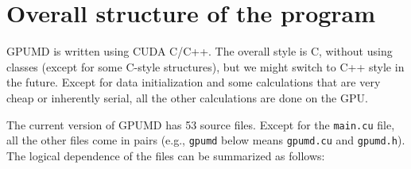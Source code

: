 \documentclass[12pt,a4paper]{report}
\begin{document}
\section{Overall structure of the program}

GPUMD is written using CUDA C/C++. The overall style is C, without using classes (except for some C-style structures), but we might switch to C++ style in the future. Except for data initialization and some calculations that are very cheap or inherently serial, all the other calculations are done on the GPU.

The current version of GPUMD has 53 source files. Except for the \verb"main.cu" file, all the other files come in pairs (e.g., \verb"gpumd" below means \verb"gpumd.cu" and \verb"gpumd.h"). The logical dependence of the files can be summarized as follows:
\end{document}
